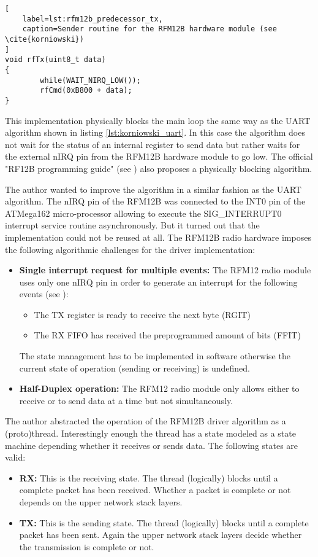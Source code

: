 \begin{lstlisting}[
    label=lst:rfm12b_predecessor_tx,
    caption=Sender routine for the RFM12B hardware module (see \cite{korniowski})
]
void rfTx(uint8_t data)
{
        while(WAIT_NIRQ_LOW());
        rfCmd(0xB800 + data);
}
\end{lstlisting}

This implementation physically blocks the main loop the same way as the UART algorithm shown in listing \ref{lst:korniowski_uart}. In this case the algorithm does not wait for the status of an internal register to send data but rather waits for the external nIRQ pin from the RFM12B hardware module to go low. The official "RF12B programming guide" (see \cite{rf12b_programming_guide}) also proposes a physically blocking algorithm.

The author wanted to improve the algorithm in a similar fashion as the UART algorithm. The nIRQ pin of the RFM12B was connected to the INT0 pin of the ATMega162 micro-processor allowing to execute the SIG\_INTERRUPT0 interrupt service routine asynchronously. But it turned out that the implementation could not be reused at all. The RFM12B radio hardware imposes the following algorithmic challenges for the driver implementation:
\begin{itemize}
\item \textbf{Single interrupt request for multiple events:} The RFM12 radio module uses only one nIRQ pin in order to generate an interrupt for the following events (see \cite{sis4221_datasheet}):
\begin{itemize}
\item The TX register is ready to receive the next byte (RGIT)
\item The RX FIFO has received the preprogrammed amount of bits (FFIT)
\end{itemize}
The state management has to be implemented in software otherwise the current state of operation (sending or receiving) is undefined.
\item \textbf{Half-Duplex operation:} The RFM12 radio module only allows either to receive or to send data at a time but not simultaneously.
\end{itemize}

The author abstracted the operation of the RFM12B driver algorithm as a (proto)thread. Interestingly enough the thread has a state modeled as a state machine depending whether it receives or sends data. The following states are valid:

\begin{itemize}
\item \textbf{RX:} This is the receiving state. The thread (logically) blocks until a complete packet has been received. Whether a packet is complete or not depends on the upper network stack layers.
\item \textbf{TX:} This is the sending state. The thread (logically) blocks until a complete packet has been sent. Again the upper network stack layers decide whether the transmission is complete or not.
\end{itemize}


